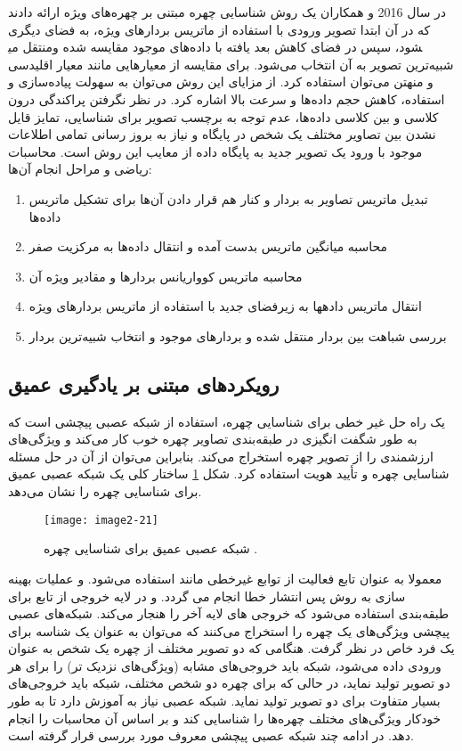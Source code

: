 \noindent
در سال 2016  و همکاران \cite{7854053} یک روش شناسایی چهره مبتنی بر چهره‌های ویژه ارائه دادند که در آن ابتدا تصویر ورودی با استفاده از ماتریس بردارهای ویژه، به فضای دیگری منتقل می‎شود، سپس در فضای کاهش بعد یافته با داده‌های موجود مقایسه شده و شبیه‌ترین تصویر به آن انتخاب می‌شود. برای مقایسه از معیارهایی مانند معیار اقلیدسی و منهتن می‌توان استفاده کرد. از مزایای این روش می‌توان به سهولت پیاده‌سازی و استفاده، کاهش حجم داده‌ها و سرعت بالا اشاره کرد. در نظر نگرفتن پراکندگی درون کلاسی و بین کلاسی داده‌ها، عدم توجه به برچسب تصویر برای شناسایی، تمایز قایل نشدن بین تصاویر مختلف یک شخص در پایگاه و نیاز به بروز رسانی تمامی اطلاعات موجود با ورود یک تصویر جدید به پایگاه داده از معایب این روش است. 
محاسبات ریاضی و مراحل انجام آن‌ها:
\begin{enumerate}
\item
	تبدیل ماتریس تصاویر به بردار و کنار هم قرار دادن آن‌ها برای تشکیل ماتریس داده‌ها
\item 
	محاسبه‏ میانگین ماتریس بدست آمده و انتقال داده‌ها به مرکزیت صفر
\item
	محاسبه‏ ماتریس کوواریانس بردارها و مقادیر ویژه‏ آن
\item
	انتقال ماتریس داده‏ها به زیرفضای جدید با استفاده از ماتریس بردارهای ویژه
\item
	بررسی شباهت بین بردار منتقل شده و بردارهای موجود و انتخاب شبیه‌ترین بردار
\end{enumerate}
 
\subsection{رویکردهای مبتنی بر یادگیری عمیق}
یک راه حل غیر خطی برای شناسایی چهره، استفاده از شبکه‌ عصبی پیچشی است که به طور شگفت انگیزی در طبقه‌بندی تصاویر چهره خوب کار می‌کند و ویژگی‌های ارزشمندی را از تصویر چهره استخراج می‌کند. بنابراین می‌توان از آن در حل مسئله شناسایی چهره‌ و تأیید هویت استفاده کرد. شکل \ref{image2-21} ساختار کلی یک شبکه عصبی عمیق برای شناسایی چهره را نشان می‌دهد.
 
\begin{figure}[h]
\centering
  \texttt{[image: image2-21]}
  \caption{شبکه عصبی عمیق برای شناسایی چهره \cite{cnn}.}
  \label{image2-21}
\end{figure}

\noindent
معمولا به عنوان تابع فعالیت از توابع غیرخطی مانند   استفاده می‌شود. و عملیات بهینه سازی به روش پس انتشار خطا انجام می گردد. و در لایه خروجی از تابع  برای طبقه‌بندی استفاده می‌شود که خروجی های لایه آخر را هنجار می‌کند. شبکه‌های عصبی پیچشی ویژگی‌های یک چهره را استخراج می‌کنند که می‌توان به عنوان یک شناسه برای یک فرد خاص در نظر گرفت. هنگامی که دو تصویر مختلف از چهره یک شخص به عنوان ورودی داده می‌شود، شبکه باید خروجی‌های مشابه (ویژگی‌های نزدیک تر) را برای هر دو تصویر تولید نماید، در حالی که برای چهره دو شخص مختلف، شبکه باید خروجی‌های بسیار متفاوت برای دو تصویر تولید نماید. شبکه عصبی نیاز به آموزش دارد تا به طور خودکار ویژگی‌های مختلف چهره‌ها را شناسایی کند و بر اساس آن محاسبات را انجام دهد. در ادامه چند شبکه عصبی پیچشی معروف مورد بررسی قرار گرفته است.

